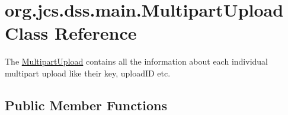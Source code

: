 \hypertarget{classorg_1_1jcs_1_1dss_1_1main_1_1MultipartUpload}{}\section{org.\+jcs.\+dss.\+main.\+Multipart\+Upload Class Reference}
\label{classorg_1_1jcs_1_1dss_1_1main_1_1MultipartUpload}


The \hyperlink{classorg_1_1jcs_1_1dss_1_1main_1_1MultipartUpload}{Multipart\+Upload} contains all the information about each individual multipart upload like their key, upload\+ID etc.  


\subsection*{Public Member Functions}
